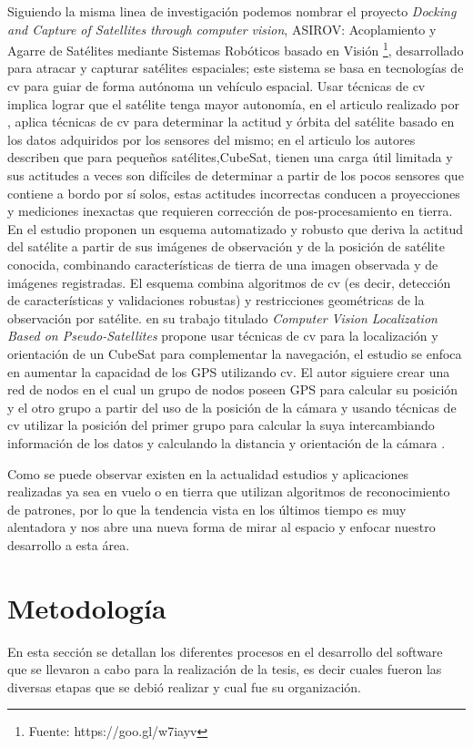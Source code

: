 Siguiendo la misma linea de investigación podemos nombrar el proyecto \textit{Docking and Capture of Satellites through computer vision}, ASIROV: Acoplamiento y Agarre de Satélites mediante Sistemas Robóticos basado en Visión \footnote{Fuente: https://goo.gl/w7iayv}, desarrollado para atracar y capturar satélites espaciales; este sistema se basa  en tecnologías de \ac{cv} para guiar de forma autónoma un vehículo espacial. Usar técnicas de \ac{cv} implica lograr que el satélite tenga mayor autonomía, en el articulo realizado por \cite{Kouyama}, aplica técnicas de \ac{cv} para determinar la actitud y órbita del satélite basado en los datos adquiridos por los sensores del mismo; en el articulo los autores describen que para pequeños satélites,CubeSat, tienen una carga útil limitada y sus actitudes a veces son difíciles de determinar a partir de los pocos sensores que contiene a bordo por sí solos, estas actitudes incorrectas conducen a proyecciones y mediciones inexactas que requieren corrección de pos-procesamiento en tierra. En el estudio proponen un esquema automatizado y robusto que deriva la actitud del satélite a partir de sus imágenes de observación y de la posición de satélite conocida, combinando características de tierra de una imagen observada y de imágenes registradas. El esquema combina algoritmos de \ac{cv} (es decir, detección de características y validaciones robustas) y restricciones geométricas de la observación por satélite. \cite{Huggins} en su trabajo titulado \textit{Computer Vision Localization Based on Pseudo-Satellites} propone usar técnicas de \ac{cv} para la localización y orientación de un CubeSat para complementar la navegación, el estudio se enfoca en  aumentar la capacidad de los GPS utilizando \ac{cv}. El autor siguiere crear una red de nodos en el cual un grupo de nodos poseen GPS para calcular su posición y el otro grupo a partir del uso de la posición de la cámara y usando técnicas de  \ac{cv}  utilizar la posición del primer grupo para calcular la suya intercambiando información de los datos y calculando la distancia y orientación de la cámara \citep{Huggins}. 

Como se puede observar existen en la actualidad estudios y aplicaciones realizadas ya sea en vuelo o en tierra que utilizan algoritmos de reconocimiento de patrones, por lo que la tendencia vista en los últimos tiempo es muy alentadora y nos abre una nueva forma de mirar al espacio y enfocar nuestro desarrollo a esta área.


\section{Metodología}\label{sec:metodologia}
En esta sección se detallan los diferentes procesos en el desarrollo del software que se llevaron a cabo para la realización de la tesis, es decir cuales fueron las diversas etapas que se debió realizar y cual fue su organización.

